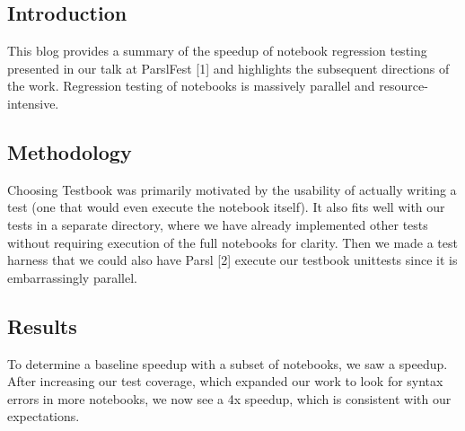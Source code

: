 \subsection{Introduction}


 This blog provides a summary of the speedup of notebook regression testing presented in our talk at ParslFest [1] %
 and highlights the subsequent directions of the work. Regression testing of notebooks is massively parallel and resource-intensive.

\subsection{Methodology}
 Choosing Testbook \cite{} was primarily motivated by the usability of actually writing a test (one that would even execute the notebook itself). It also fits well with our tests in a separate directory, where we have already implemented other tests without requiring execution of the full notebooks for clarity. Then we made a test harness that we could also have Parsl [2] execute our testbook unittests since it is embarrassingly parallel.

\subsection{Results}
To determine a baseline speedup with a subset of notebooks, we saw a  speedup. 
After increasing our test coverage, which expanded our work to look for syntax errors in more notebooks, 
we  now see a 4x speedup, which is consistent with our expectations. 

